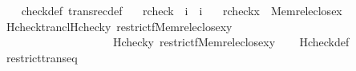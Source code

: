 \begin{isabellebody}
%
\isadelimproof
\ \ %
\endisadelimproof
%
\isatagproof
{}\isamarkupfalse%
\ check{\isacharunderscore}{\kern0pt}def\ transrec{\isacharunderscore}{\kern0pt}def\ \isacommand{{\isachardot}{\kern0pt}{\isachardot}{\kern0pt}}\isamarkupfalse%
%
\endisatagproof
{\isafoldproof}%
%
\isadelimproof
\isanewline
%
\endisadelimproof
\isanewline
{}\isamarkupfalse%
\isanewline
\ \ rcheck\ {\isacharcolon}{\kern0pt}{\isacharcolon}{\kern0pt}\ {\isachardoublequoteopen}i\ {\isasymRightarrow}\ i{\isachardoublequoteclose}\ \isanewline
\ \ {\isachardoublequoteopen}rcheck{\isacharparenleft}{\kern0pt}x{\isacharparenright}{\kern0pt}\ {\isasymequiv}\ Memrel{\isacharparenleft}{\kern0pt}eclose{\isacharparenleft}{\kern0pt}{\isacharbraceleft}{\kern0pt}x{\isacharbraceright}{\kern0pt}{\isacharparenright}{\kern0pt}{\isacharparenright}{\kern0pt}{\isacharcircum}{\kern0pt}{\isacharplus}{\kern0pt}{\isachardoublequoteclose}\isanewline
\isanewline
\isanewline
{}\isamarkupfalse%
\ Hcheck{\isacharunderscore}{\kern0pt}trancl{\isacharcolon}{\kern0pt}{\isachardoublequoteopen}Hcheck{\isacharparenleft}{\kern0pt}y{\isacharcomma}{\kern0pt}\ restrict{\isacharparenleft}{\kern0pt}f{\isacharcomma}{\kern0pt}Memrel{\isacharparenleft}{\kern0pt}eclose{\isacharparenleft}{\kern0pt}{\isacharbraceleft}{\kern0pt}x{\isacharbraceright}{\kern0pt}{\isacharparenright}{\kern0pt}{\isacharparenright}{\kern0pt}{\isacharminus}{\kern0pt}{\isacharbackquote}{\kern0pt}{\isacharbackquote}{\kern0pt}{\isacharbraceleft}{\kern0pt}y{\isacharbraceright}{\kern0pt}{\isacharparenright}{\kern0pt}{\isacharparenright}{\kern0pt}\isanewline
\ \ \ \ \ \ \ \ \ \ \ \ \ \ \ \ \ \ \ {\isacharequal}{\kern0pt}\ Hcheck{\isacharparenleft}{\kern0pt}y{\isacharcomma}{\kern0pt}\ restrict{\isacharparenleft}{\kern0pt}f{\isacharcomma}{\kern0pt}{\isacharparenleft}{\kern0pt}Memrel{\isacharparenleft}{\kern0pt}eclose{\isacharparenleft}{\kern0pt}{\isacharbraceleft}{\kern0pt}x{\isacharbraceright}{\kern0pt}{\isacharparenright}{\kern0pt}{\isacharparenright}{\kern0pt}{\isacharcircum}{\kern0pt}{\isacharplus}{\kern0pt}{\isacharparenright}{\kern0pt}{\isacharminus}{\kern0pt}{\isacharbackquote}{\kern0pt}{\isacharbackquote}{\kern0pt}{\isacharbraceleft}{\kern0pt}y{\isacharbraceright}{\kern0pt}{\isacharparenright}{\kern0pt}{\isacharparenright}{\kern0pt}{\isachardoublequoteclose}\isanewline
%
\isadelimproof
\ \ %
\endisadelimproof
%
\isatagproof
{}\isamarkupfalse%
\ Hcheck{\isacharunderscore}{\kern0pt}def\isanewline
\ \ \isamarkupfalse%
\ restrict{\isacharunderscore}{\kern0pt}trans{\isacharunderscore}{\kern0pt}eq\ \isamarkupfalse%

\end{isabellebody}
